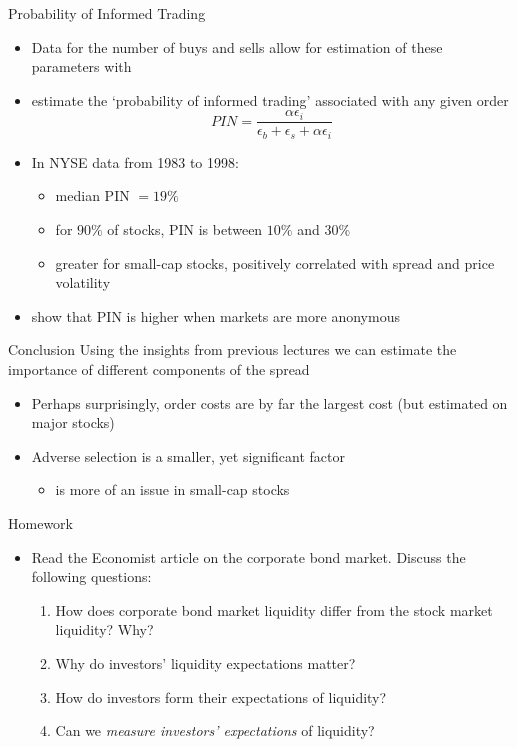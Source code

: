 \documentclass[english,10pt
,aspectratio=169
]{beamer}
\begin{document}
\begin{frame}{Probability of Informed Trading}
	\begin{itemize}
		\item Data for the number of buys and sells allow for estimation of these parameters with 
		\item \textbf{\citet*{easley_is_2002}} estimate the `probability of informed trading' associated with any given order
		\begin{equation} \tag{5.27}
		PIN = \frac{\alpha \epsilon_i}{\epsilon_b + \epsilon_s + \alpha \epsilon_i}
		\end{equation}
		\item In NYSE data from 1983 to 1998:
		\begin{itemize}
			\item median PIN $=19\%$
			\item for $90\%$ of stocks, PIN is between $10\%$ and $30\%$
			\item greater for small-cap stocks, positively correlated with spread and price volatility
		\end{itemize}
		\item \textbf{\citet*{grammig_knowing_2001}} show that PIN is higher when markets are more anonymous
	\end{itemize}
\end{frame}


\begin{frame}{Conclusion}
	Using the insights from previous lectures we can estimate the importance of different components of the spread
	\begin{itemize}
		\item Perhaps surprisingly, order costs are by far the largest cost (but estimated on major stocks)
		\item Adverse selection is a smaller, yet significant factor 
		\begin{itemize}
			\item is more of an issue in small-cap stocks
		\end{itemize}
	\end{itemize}
\end{frame}


\begin{frame}{Homework}
\begin{itemize}
	\item Read the Economist article on the corporate bond market. Discuss the following questions:
	\begin{enumerate}
		\item How does corporate bond market liquidity differ from the stock market liquidity? Why?
		\item Why do investors' liquidity expectations matter?
		\item How do investors form their expectations of liquidity?
		\item Can we \emph{measure investors' expectations} of liquidity?
	\end{enumerate}
\end{itemize}
\end{frame}
\end{document}
